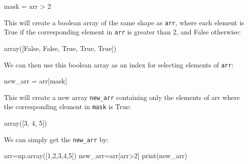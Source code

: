 \documentclass[11pt]{article}
\newenvironment{Shaded}{}{}
\newcommand{\DecValTok}[1]{\textcolor[rgb]{0.25,0.63,0.44}{{#1}}}
\newcommand{\NormalTok}[1]{{#1}}
\newcommand{\VariableTok}[1]{\textcolor[rgb]{0.10,0.09,0.49}{{#1}}}
\newcommand{\OperatorTok}[1]{\textcolor[rgb]{0.40,0.40,0.40}{{#1}}}
\newcommand{\BuiltInTok}[1]{{#1}}
\begin{document}
\begin{Shaded}
\begin{Highlighting}[]
\NormalTok{mask }\OperatorTok{=}\NormalTok{ arr }\OperatorTok{\textgreater{}} \DecValTok{2}
\end{Highlighting}
\end{Shaded}

This will create a boolean array of the same shape as \texttt{arr},
where each element is True if the corresponding element in \texttt{arr}
is greater than 2, and False otherwise:

\begin{Shaded}
\begin{Highlighting}[]
\NormalTok{array([}\VariableTok{False}\NormalTok{, }\VariableTok{False}\NormalTok{,  }\VariableTok{True}\NormalTok{,  }\VariableTok{True}\NormalTok{,  }\VariableTok{True}\NormalTok{])}
\end{Highlighting}
\end{Shaded}

We can then use this boolean array as an index for selecting elements of
\texttt{arr}:

\begin{Shaded}
\begin{Highlighting}[]
\NormalTok{new\_arr }\OperatorTok{=}\NormalTok{ arr[mask]}
\end{Highlighting}
\end{Shaded}

This will create a new array \texttt{new\_arr} containing only the
elements of arr where the corresponding element in \texttt{mask} is
True:

\begin{Shaded}
\begin{Highlighting}[]
\NormalTok{array([}\DecValTok{3}\NormalTok{, }\DecValTok{4}\NormalTok{, }\DecValTok{5}\NormalTok{])}
\end{Highlighting}
\end{Shaded}

We can simply get the \texttt{new\_arr} by:

\begin{Shaded}
\begin{Highlighting}[]
\NormalTok{arr}\OperatorTok{=}\NormalTok{np.array([}\DecValTok{1}\NormalTok{,}\DecValTok{2}\NormalTok{,}\DecValTok{3}\NormalTok{,}\DecValTok{4}\NormalTok{,}\DecValTok{5}\NormalTok{])}
\NormalTok{new\_arr}\OperatorTok{=}\NormalTok{arr[arr}\OperatorTok{\textgreater{}}\DecValTok{2}\NormalTok{]}
\BuiltInTok{print}\NormalTok{(new\_arr)}
\end{Highlighting}
\end{Shaded}
\end{document}
